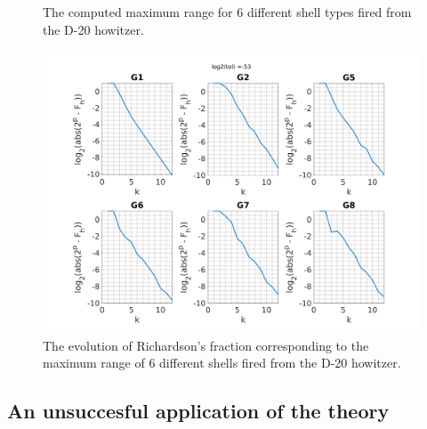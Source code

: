 \documentclass[runningheads]{llncs}
\begin{document}
\begin{figure}
  \centering
  \vgamma
  \caption{The computed maximum range for 6 different shell types fired from the D-20 howitzer.}
  \label{fig:maxrange_rk1_table_tol53} 
\end{figure}

\begin{figure}
  \centering
  \includegraphics[width=12cm]{maxrange_rk1_tol53.png}
  \caption{The evolution of Richardson's fraction corresponding to the maximum range of 6 different shells fired from the D-20 howitzer.} \label{fig:maxrange_rk1_fraction_tol53}
\end{figure}

\subsection{An unsuccesful application of the theory}
\end{document}
